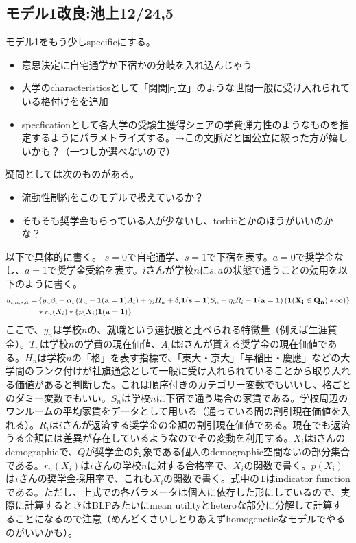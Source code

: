 \documentclass{jsarticle}
\begin{document}
	\subsection{モデル1改良:池上12/24,5}
	\par
	モデル1をもう少しspecificにする。
	\begin{itemize}
		\item 意思決定に自宅通学か下宿かの分岐を入れ込んじゃう
		\item 大学のcharacteristicsとして「関関同立」のような世間一般に受け入れられている格付けをを追加
		\item specficationとして各大学の受験生獲得シェアの学費弾力性のようなものを推定するようにパラメトライズする。→この文脈だと国公立に絞った方が嬉しいかも？（一つしか選べないので）
	\end{itemize}
	\par
	疑問としては次のものがある。
	\begin{itemize}
		\item 流動性制約をこのモデルで扱えているか？
		\item そもそも奨学金もらっている人が少ないし、torbitとかのほうがいいのかな？
	\end{itemize}
	\par
	以下で具体的に書く。
	$s = 0$で自宅通学、$s = 1$で下宿を表す。$a = 0$で奨学金なし、$a = 1$で奨学金受給を表す。$i$さんが学校$n$に$s, a$の状態で通うことの効用を以下のように書く。
	\begin{align*}
	u_{i,n,s,a} = &\left\{ y_n{\bf \beta_i} + \alpha_i \left( T_n - {\bf 1(a = 1)} A_i\right) + \gamma_i H_n + \delta_i {\bf 1(s = 1)} S_n + \eta_i R_i - {\bf 1(a = 1)}\left( {\bf 1(X_i \in Q_n)} * \infty \right) \right\}\\
	 & * r_n(X_i) * \left\{ p(X_i) {\bf 1(a = 1)}\right\}
	\end{align*}
	ここで、$y_n$は学校$n$の、就職という選択肢と比べられる特徴量（例えば生涯賃金）。$T_n$は学校$n$の学費の現在価値、$A_i$は$i$さんが貰える奨学金の現在価値である。$H_n$は学校$n$の「格」を表す指標で、「東大・京大」「早稲田・慶應」などの大学間のランク付けが社旗通念として一般に受け入れられていることから取り入れる価値があると判断した。これは順序付きのカテゴリー変数でもいいし、格ごとのダミー変数でもいい。$S_n$は学校$n$に下宿で通う場合の家賃である。学校周辺のワンルームの平均家賃をデータとして用いる（通っている間の割引現在価値を入れる）。$R_i$は$i$さんが返済する奨学金の金額の割引現在価値である。現在でも返済うる金額には差異が存在しているようなのでその変動を利用する。$X_i$はiさんのdemographicで、$Q$が奨学金の対象である個人のdemographic空間ないの部分集合である。$r_n(X_i)$は$i$さんの学校$n$に対する合格率で、$X_i$の関数で書く。$p(X_i)$は$i$さんの奨学金採用率で、これも$X_i$の関数で書く。式中の${\bf 1}$はindicator functionである。ただし、上式での各パラメータは個人に依存した形にしているので、実際に計算するときはBLPみたいにmean utilityとheteroな部分に分解して計算することになるので注意（めんどくさいしとりあえずhomogeneticなモデルでやるのがいいかも）。
\end{document}
